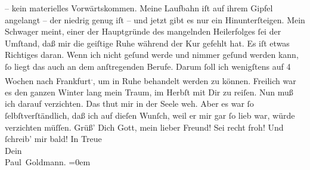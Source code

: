 \begin{ledgroupsized}[t]{13cm}
               – kein materielles Vorwärtskommen. Meine Laufbahn iſt auf ihrem Gipfel angelangt –
               der niedrig genug iſt – und jetzt gibt es nur ein Hinunterſteigen.\pend
           \pstart
           {\pb}Mein Schwager meint, einer der Hauptgründe des mangelnden
               Heilerfolges ſei der Umſtand, daß mir die geiſtige Ruhe während der Kur gefehlt hat.
               Es iſt etwas Richtiges daran. Wenn ich nicht geſund werde und nimmer geſund werden
               kann, ſo liegt das auch an dem anſtregenden Berufe. Darum ſoll ich wenigſtens auf 4
               Wochen nach Frankfurt\substVorne{}\textsuperscript{.}\substDazwischen{},\substHinten{} um in Ruhe behandelt werden zu können. Freilich war es den ganzen Winter
               lang mein Traum, im Herbſt mit Dir zu reiſen. Nun muß ich darauf verzichten. Das thut
               mir in der Seele {\pb}weh. Aber es war ſo
               ſelbſtverſtändlich, daß ich auf dieſen Wunſch, weil er mir gar ſo lieb war, würde
               verzichten müſſen.\pend
           \pstart
           Grüß’ Dich Gott, mein lieber Freund! Sei recht froh! Und ſchreib’ mir bald!\pend
           \pstart
           In Treue {\\[\baselineskip]}Dein {\\[\baselineskip]}\spacefill\mbox{Paul Goldmann.}\pend
           \leftskip=0em{}
         
         \endnumbering{}\end{ledgroupsized}  \newcommand{\dateiname}{L02617}\newcommand{\titel}{Paul Goldmann an Arthur Schnitzler, 21. 4. [1894]}\newcommand{\editorInnen}{Martin Anton Müller und Laura Untner}
      